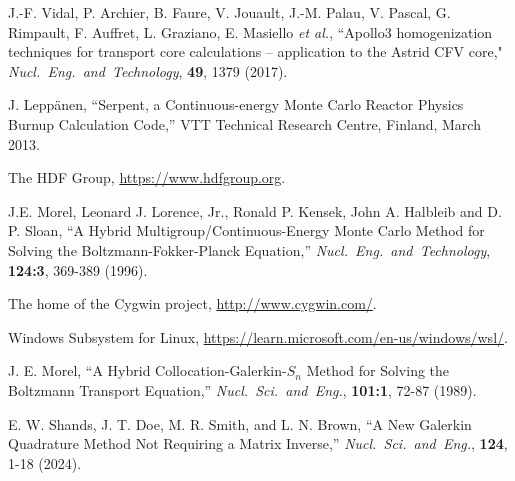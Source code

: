 \begin{thebibliography}{99}
J.-F. Vidal, P. Archier, B. Faure, V. Jouault, J.-M. Palau, V. Pascal, G. Rimpault, F. Auffret, L. Graziano, E. Masiello {\sl et al.}, ``Apollo3
homogenization techniques for transport core calculations -- application to the Astrid CFV core," {\sl Nucl.~Eng.~and~Technology}, {\bf 49}, 1379 (2017).

J. Lepp\"anen, ``Serpent, a Continuous-energy Monte Carlo Reactor Physics Burnup Calculation Code,'' VTT Technical Research Centre, Finland, March 2013.

The HDF Group, \url{https://www.hdfgroup.org}.

J.E. Morel, Leonard J. Lorence, Jr., Ronald P. Kensek, John A. Halbleib and D. P. Sloan, ``A Hybrid Multigroup/Continuous-Energy Monte Carlo Method for
Solving the Boltzmann-Fokker-Planck Equation,'' {\sl Nucl.~Eng.~and~Technology}, {\bf 124:3}, 369-389 (1996).

The home of the Cygwin project, \url{http://www.cygwin.com/}.

Windows Subsystem for Linux, \url{https://learn.microsoft.com/en-us/windows/wsl/}.

J. E. Morel, ``A Hybrid Collocation-Galerkin-$S_n$ Method for Solving the Boltzmann Transport Equation,'' {\sl Nucl.~Sci.~and~Eng.}, {\bf 101:1}, 72-87 (1989).

E. W. Shands, J. T. Doe, M. R. Smith, and L. N. Brown, ``A New Galerkin Quadrature Method Not Requiring a Matrix Inverse,'' {\sl Nucl.~Sci.~and~Eng.}, {\bf 124}, 1-18 (2024).

\end{thebibliography}
